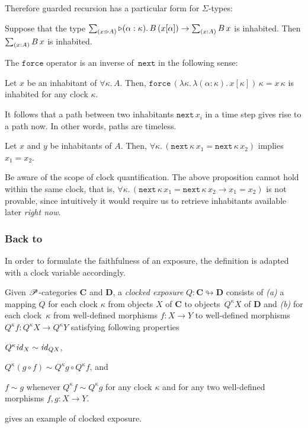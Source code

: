 \documentclass[a4paper,UKenglish,numberwithinsect,cleveref,thm-restate,draft]{lipics-v2021}
\numberwithin{equation}{section}
\theoremstyle{definition}
\theoremstyle{plain}
\begin{document}
Therefore guarded recursion has a particular form for $\Sigma$-types:
\begin{corollary} \label{coro:lob-induction-sum}
  Suppose that the type $\sm{x : \laterp A} \laterp (\alpha : \kappa).\,B\,(x[\alpha]) \to \sm{x : A} B\,x$ is inhabited.
  Then $\sm{x : A} B\,x$ is inhabited.
\end{corollary}

The $\mathtt{force}$ operator is an inverse of~$\mathtt{next}$ in the following sense:%
\begin{lemma}
  Let $x$ be an inhabitant of $\forall \kappa.\, A$. Then, 
  $\mathtt{force}\,(\lambda \kappa.\,\lambda (\alpha : \kappa).\, x [\kappa])\,\kappa = x\,\kappa$ is inhabited for any clock $\kappa$.
\end{lemma}

It follows that a path between two inhabitants $\mathtt{next}\,x_i$ in a time step gives rise to a path now.
In other words, paths are timeless.%
\begin{proposition}\label{lem:later-identity}
  Let $x$ and $y$ be inhabitants of $A$. Then, $\forall \kappa.\, \left(\mathtt{next}\,\kappa\,x_1 = \mathtt{next}\,\kappa\,x_2\right)$ implies $x_1 = x_2$.
\end{proposition}
Be aware of the scope of clock quantification.
The above proposition cannot hold within the same clock, that is, $\forall \kappa.\, \left(\mathtt{next}\,\kappa\,x_1 = \mathtt{next}\,\kappa\,x_2 \to x_1 =x_2\right)$ is not provable, since intuitively it would require us to retrieve inhabitants available later \emph{right now}.

\subsubsection{Back to \texorpdfstring{\GL}{GL}} \label{sec:GL}

In order to formulate the faithfulness of an exposure, the definition is adapted with a clock variable accordingly.%
\begin{definition}
  Given $\mathscr{P}$-categories $\mathbf{C}$ and $\mathbf{D}$, a \emph{clocked exposure} $Q\colon \mathbf{C} \looparrowright \mathbf{D}$ consists of \emph{(a)} a mapping $Q$ for each clock $\kappa$ from objects $X$ of $\mathbf{C}$ to objects~$Q^\kappa X$ of $\mathbf{D}$ and \emph{(b)} for each clock~$\kappa$ from well-defined morphisms $f\colon X \to Y$ to well-defined morphisms $Q^\kappa f\colon Q^\kappa X \to Q^\kappa Y$ satisfying following properties
  \begin{romanenumerate}
    \item $Q^\kappa \mathit{id}_X \sim \mathit{id}_{QX}$,
    \item $Q^\kappa (g \circ f) \sim Q^\kappa g \circ Q^\kappa f$, and
    \item $f \sim g$ whenever $Q^\kappa f \sim Q^\kappa g$ for any clock $\kappa$ and for any two well-defined morphisms $f, g\colon X \to Y$. 
  \end{romanenumerate}
\end{definition}
 gives an example of clocked exposure.
\end{document}
